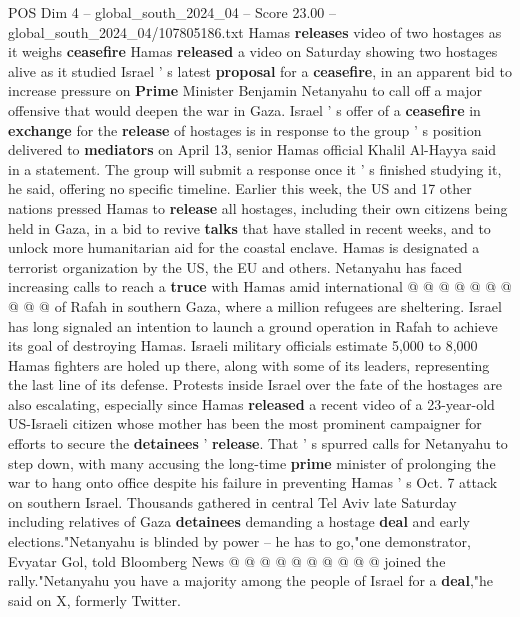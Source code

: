 \begin{textsample}{POS Dim 4 – global\_south\_2024\_04 – Score 23.00 – global\_south\_2024\_04/107805186.txt}  \label{ex:f4_pos_261}
Hamas \textbf{releases} video of two hostages as it weighs \textbf{ceasefire} Hamas \textbf{released} a video on Saturday showing two hostages alive as it studied Israel ' s latest \textbf{proposal} for a \textbf{ceasefire}, in an apparent bid to increase pressure on \textbf{Prime} Minister Benjamin Netanyahu to call off a major offensive that would deepen the war in Gaza.
Israel ' s offer of a \textbf{ceasefire} in \textbf{exchange} for the \textbf{release} of hostages is in response to the group ' s position delivered to \textbf{mediators} on April 13, senior Hamas official Khalil Al-Hayya said in a statement.
The group will submit a response once it ' s finished studying it, he said, offering no specific timeline.
Earlier this week, the US and 17 other nations pressed Hamas to \textbf{release} all hostages, including their own citizens being held in Gaza, in a bid to revive \textbf{talks} that have stalled in recent weeks, and to unlock more humanitarian aid for the coastal enclave.
Hamas is designated a terrorist organization by the US, the EU and others.
Netanyahu has faced increasing calls to reach a \textbf{truce} with Hamas amid international @ @ @ @ @ @ @ @ @ @ of Rafah in southern Gaza, where a million refugees are sheltering.
Israel has long signaled an intention to launch a ground operation in Rafah to achieve its goal of destroying Hamas.
Israeli military officials estimate 5,000 to 8,000 Hamas fighters are holed up there, along with some of its leaders, representing the last line of its defense.
Protests inside Israel over the fate of the hostages are also escalating, especially since Hamas \textbf{released} a recent video of a 23-year-old US-Israeli citizen whose mother has been the most prominent campaigner for efforts to secure the \textbf{detainees} ' \textbf{release}.
That ' s spurred calls for Netanyahu to step down, with many accusing the long-time \textbf{prime} minister of prolonging the war to hang onto office despite his failure in preventing Hamas ' s Oct. 7 attack on southern Israel.
Thousands gathered in central Tel Aviv late Saturday including relatives of Gaza \textbf{detainees} demanding a hostage \textbf{deal} and early elections."Netanyahu is blinded by power -- he has to go,"one demonstrator, Evyatar Gol, told Bloomberg News @ @ @ @ @ @ @ @ @ @ joined the rally."Netanyahu you have a majority among the people of Israel for a \textbf{deal},"he said on X, formerly Twitter.

\end{textsample}
